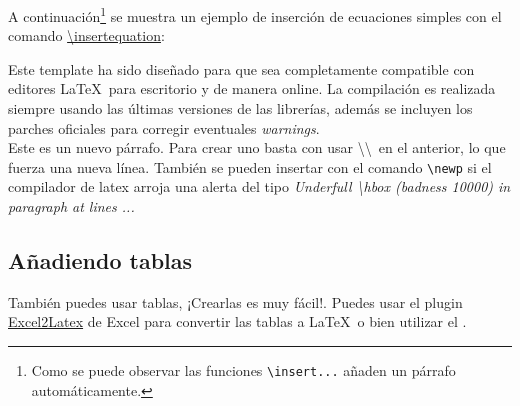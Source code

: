 
	A continuación\footnote{Como se puede observar las funciones \texttt{\textbackslash insert...} añaden un párrafo automáticamente.} se muestra un ejemplo de inserción de ecuaciones simples con el comando \href{https://latex.ppizarror.com/informe.html#hlp-formulae}{\textbackslash insertequation}:


	Este template \cite{template} ha sido diseñado para que sea completamente compatible con editores \LaTeX\ para escritorio y de manera online. La compilación es realizada siempre usando las últimas versiones de las librerías, además se incluyen los parches oficiales para corregir eventuales \textit{warnings}. \\

	Este es un nuevo párrafo. Para crear uno basta con usar \textbackslash\textbackslash\ en el anterior, lo que fuerza una nueva línea. También se pueden insertar con el comando \texttt{\textbackslash newp} si el compilador de latex arroja una alerta del tipo \textit{Underfull \textbackslash hbox (badness 10000) in paragraph at lines ...}

\subsection{Añadiendo tablas}

	También puedes usar tablas, ¡Crearlas es muy fácil!. Puedes usar el plugin \href{https://www.ctan.org/tex-archive/support/excel2latex}{Excel2Latex} \cite{excel2latex} de Excel para convertir las tablas a \LaTeX\ o bien utilizar el  \cite{tablesgenerator}.


